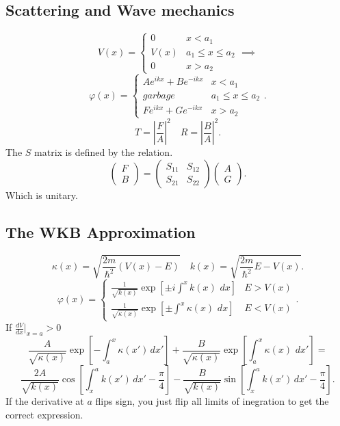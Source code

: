 \documentclass{article}
\begin{document}
  \subsection*{Scattering and Wave mechanics}
    \[
      V(x) = 
      \begin{cases}
        0 & x < a_1 \\
        V(x) & a_1 \leq x \leq a_2 \\
        0 & x > a_2
      \end{cases} 
      \implies 
    \]
    \[
      \varphi(x) = 
      \begin{cases}
        A e^{i k x} + B e^{-i k x} & x < a_1 \\
        garbage & a_1 \leq x \leq a_2 \\
        F e^{i k x} + G e^{-i k x} & x > a_2
      \end{cases}
    .\] 
    \[
    T = \left|\frac{F}{A}\right|^2 \quad R = \left|\frac{B}{A}\right|^2
    .\]    
   The $S$ matrix is defined by the relation.
   \[
   \begin{pmatrix}
     F \\
     B
   \end{pmatrix}
   = 
   \begin{pmatrix}
     S_{11} & S_{12} \\
     S_{21} & S_{22} 
   \end{pmatrix}
   \begin{pmatrix}
     A \\
     G
   \end{pmatrix}
   .\] 
   Which is unitary.


  \subsection*{The WKB Approximation}
    \[
    \kappa(x) = \sqrt{\frac{2m}{\hbar^2}(V(x) - E)} \quad
    k(x) = \sqrt{\frac{2m}{\hbar^2} E - V(x)}
    .\]    
    \[
      \varphi(x) = 
      \begin{cases}
        \frac{1}{\sqrt{k(x)}} \exp[\pm i \int^x k(x)\,\,dx ]& E > V(x) \\
        \frac{1}{\sqrt{\kappa(x)}} \exp[\pm \int^x \kappa(x) \,\,dx] & E < V(x)
      \end{cases}
    .\] 
    If $\frac{d V}{dx}|_{x=a} > 0$ 
    \[
      \frac{A}{\sqrt{\kappa(x)}}\exp\left[ -\int_a^x \kappa(x')\,dx' \right] +
      \frac{B}{\sqrt{\kappa(x)}}\exp\left[\int_a^x \kappa(x)\,\,dx'\right] =
    \] 
    \[
      \frac{2A}{\sqrt{k(x)}}\cos\left[\int_x^a k(x')\,dx' - \frac{\pi}{4} \right] -
      \frac{B}{\sqrt{k(x)}}\sin\left[\int_x^a k(x')\,dx' - \frac{\pi}{4}\right]
    .\] 
    If the derivative at $a$ flips sign, you just flip all limits of inegration
    to get the correct expression.
\end{document}
